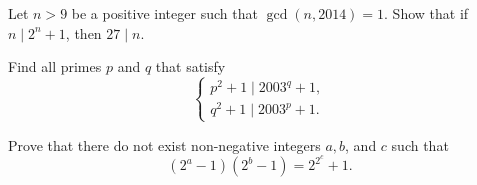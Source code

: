 \documentclass{subfile}
\begin{document}
	\begin{problem}
		Let $n>9$ be a positive integer such that $\gcd(n,2014)=1$. Show that if $n \mid 2^n+1$, then $27 \mid n$. %
	\end{problem}


	\begin{problem}
		Find all primes $p$ and $q$ that satisfy
		\[\left\{\begin{matrix} p^2+1\mid 2003^q+1,\\ q^2+1\mid 2003^p+1. \end{matrix}\right.\]
	\end{problem}

	\begin{problem}
		Prove that there do not exist non-negative integers $a,b$, and $c$ such that $$(2^a-1)(2^b-1)=2^{2^c}+1.$$ %
	\end{problem}

\end{document}
